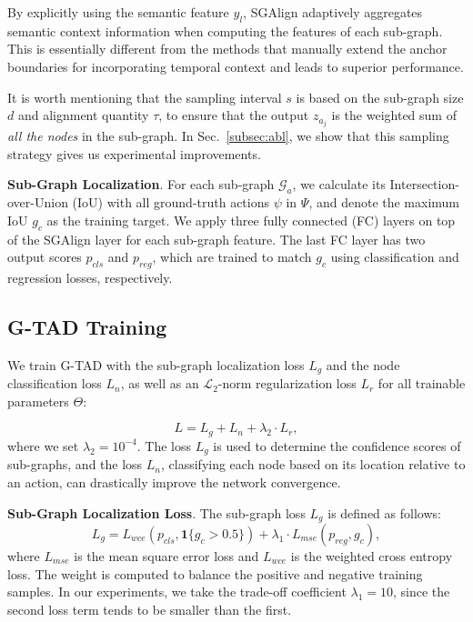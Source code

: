 \documentclass[10pt,twocolumn,letterpaper]{article}
\newcommand{\G}{\mathcal{G}}
\begin{document}
By explicitly using the semantic feature $y_l$, SGAlign  adaptively aggregates semantic context information when computing the features of each sub-graph. This is essentially different from the methods that manually extend the anchor boundaries for incorporating temporal context \cite{lin2018bsn, zhao2017temporal} and leads to superior performance. 

It is worth mentioning that the sampling interval $s$ is based on the sub-graph size $d$ and alignment quantity $\tau$, to ensure that the output $z_{a_j}$ is the weighted sum of \emph{all the nodes} in the sub-graph. In Sec.~\ref{subsec:abl}, we show that this sampling strategy gives us experimental improvements.


\noindent \textbf{Sub-Graph Localization}. For each sub-graph $\G_{a}$, we calculate its Intersection-over-Union (IoU) with all ground-truth actions $\psi$ in $\Psi$, and denote the maximum IoU $g_c$ as the training target.
We apply three fully connected (FC) layers on top of the SGAlign layer for each sub-graph feature.
The last FC layer has two output scores $p_{cls}$  and  $p_{reg}$, which are trained to match $g_c$ using classification and regression losses,  respectively.


\subsection{G-TAD Training}

We train G-TAD with the sub-graph localization loss $L_{g}$ and the node classification loss $L_n$, as well as an $\mathcal{L}_2$-norm regularization loss $L_r$  for all trainable parameters $\Theta$:

\begin{equation}
L = L_{g} +L_{n}+  \lambda_2 \cdot L_r,
\end{equation}
where we set $\lambda_2=10^{-4}$. The loss $L_{g}$ is used to determine the confidence scores of sub-graphs, 
and the loss $L_n$, classifying each node based on its location relative to an action, can drastically improve the network convergence. 


\noindent \textbf{Sub-Graph Localization Loss}. The sub-graph loss $L_{g}$ is defined as follows:
\begin{equation}
L_{g}=  {L}_{wce}(p_{cls},\mathbf{1}\{g_c > 0.5\}) + \lambda_1 \cdot {L}_{mse}(p_{reg},g_c),
\end{equation}
where ${L}_{mse}$ is the mean square error loss and ${L}_{wce}$ is the weighted cross entropy loss. The weight is computed to balance the positive and negative training samples.  In our experiments, we take the trade-off coefficient $\lambda_1=10$, since the second loss term tends to be smaller than the first. 
\end{document}
